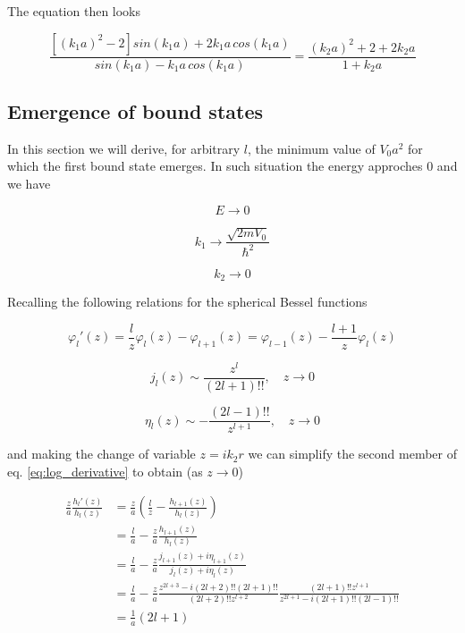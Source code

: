 \documentclass{article}
\begin{document}
The equation then looks

\begin{equation}
\frac{\left[ (k_1a)^2 - 2 \right] sin(k_1a) + 2k_1a \, cos(k_1a)}{sin(k_1a) - k_1a \, cos(k_1a)} = \frac{(k_2a)^2 + 2 + 2k_2a}{1+k_2a}
\end{equation}

\subsection{Emergence of bound states}
In this section we will derive, for arbitrary \( l \), the minimum value of \( V_0a^2 \) for which the first bound state emerges. In such situation the energy approches 0 and we have

\begin{equation}
E \rightarrow 0
\end{equation}

\begin{equation}
k_1 \rightarrow \frac{\sqrt{2mV_0}}{\hbar^2}
\end{equation}

\begin{equation}
k_2 \rightarrow 0
\end{equation}

Recalling the following relations for the spherical Bessel functions

\begin{equation}
\label{eq:bessel_derivative}
\varphi_l'(z) = \frac{l}{z} \varphi_l(z) - \varphi_{l+1}(z) = \varphi_{l-1}(z) - \frac{l+1}{z} \varphi_l(z)
\end{equation}

\begin{equation}
j_l(z) \sim \frac{z^l}{(2l+1)!!}, \quad z \rightarrow 0
\end{equation}

\begin{equation}
\eta_l(z) \sim -\frac{(2l-1)!!}{z^{l+1}}, \quad z \rightarrow 0
\end{equation}

and making the change of variable \( z = ik_2r \) we can simplify the second member of eq. \eqref{eq:log_derivative} to obtain (as \(z \rightarrow 0 \))

\begin{align}
\frac{z}{a} \frac{h_l'(z)}{h_l(z)} & = \frac{z}{a} \left(\frac{l}{z} - \frac{h_{l+1}(z)}{h_l(z)} \right) \nonumber \\
& = \frac{l}{a} - \frac{z}{a} \frac{h_{l+1}(z)}{h_l(z)} \nonumber \\
& = \frac{l}{a} - \frac{z}{a} \frac{j_{l+1}(z) + i\eta_{l+1}(z)}{j_l(z)+i\eta_l(z)} \nonumber \\
& = \frac{l}{a} - \frac{z}{a} \frac{z^{2l+3}-i(2l+2)!!(2l+1)!!}{(2l+2)!!z^{l+2}} \frac{(2l+1)!!z^{l+1}}{z^{2l+1}-i(2l+1)!!(2l-1)!!} \nonumber \\
& = \frac{1}{a} (2l+1)
\end{align}
\end{document}
